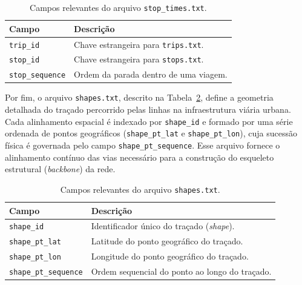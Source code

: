 \documentclass[cic,tc]{infufrgs}
\begin{document}
\begin{table}[H]
  \centering
  \caption{Campos relevantes do arquivo \texttt{stop\_times.txt}.}
  \label{tab:gtfs_stoptimes}
  \begin{tabular}{ll}
    \toprule
    \textbf{Campo} & \textbf{Descrição} \\
    \midrule
    \texttt{trip\_id} & Chave estrangeira para \texttt{trips.txt}. \\
    \texttt{stop\_id} & Chave estrangeira para \texttt{stops.txt}. \\
    \texttt{stop\_sequence} & Ordem da parada dentro de uma viagem. \\
    \bottomrule
  \end{tabular}
\end{table}

Por fim, o arquivo \texttt{shapes.txt}, descrito na Tabela~\ref{tab:gtfs_shapes}, define a geometria detalhada do traçado percorrido pelas linhas na infraestrutura viária urbana. Cada alinhamento espacial é indexado por \texttt{shape\_id} e formado por uma série ordenada de pontos geográficos (\texttt{shape\_pt\_lat} e \texttt{shape\_pt\_lon}), cuja sucessão física é governada pelo campo \texttt{shape\_pt\_sequence}. Esse arquivo fornece o alinhamento contínuo das vias necessário para a construção do esqueleto estrutural (\textit{backbone}) da rede.

\begin{table}[H]
  \centering
  \caption{Campos relevantes do arquivo \texttt{shapes.txt}.}
  \label{tab:gtfs_shapes}
  \begin{tabular}{ll}
    \toprule
    \textbf{Campo} & \textbf{Descrição} \\
    \midrule
    \texttt{shape\_id} & Identificador único do traçado (\textit{shape}). \\
    \texttt{shape\_pt\_lat} & Latitude do ponto geográfico do traçado. \\
    \texttt{shape\_pt\_lon} & Longitude do ponto geográfico do traçado. \\
    \texttt{shape\_pt\_sequence} & Ordem sequencial do ponto ao longo do traçado. \\
    \bottomrule
  \end{tabular}
\end{table}
\end{document}
